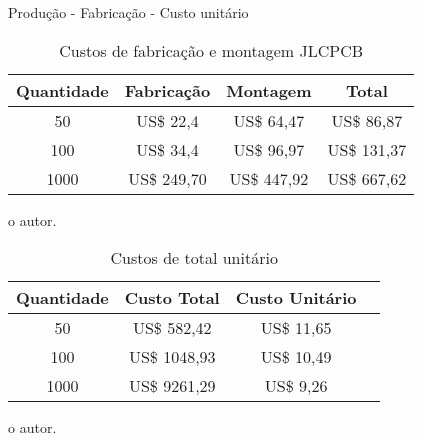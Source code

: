 \begin{frame}{Produção - Fabricação - Custo unitário}


	\begin{table}[!h]
	\captionsetup{width=9cm}%
	\caption{\label{tab:custos_montagem} Custos de fabricação e montagem JLCPCB}%
% 	
		\begin{tabular}{cccc}
			\toprule
			Quantidade & Fabricação & Montagem & Total \\
			\midrule \midrule
			50 &  US\$ 22,4 & US\$ 64,47 & US\$ 86,87 \\
			100 &  US\$ 34,4 & US\$ 96,97 & US\$ 131,37 \\
			1000 & US\$ 249,70 & US\$ 447,92 & US\$ 667,62 \\
			\bottomrule
		\end{tabular}%
	{%
	
    }
    
    \tiny{o autor.}%
    \end{table}



    \begin{table}[!h]
	\captionsetup{width=7cm}%
	\caption{\label{tab:custos_fabricacao_unitário} Custos de total unitário}%
% 	
		\begin{tabular}{cccc}
			\toprule
			Quantidade & Custo Total & Custo Unitário  \\
			\midrule \midrule
			50 &  US\$ 582,42 & US\$ 11,65 \\
			100 &  US\$ 1048,93 & US\$ 10,49  \\
			1000 & US\$ 9261,29 & US\$ 9,26  \\
			\bottomrule
		\end{tabular}%
	{%
	
    }
    
    \tiny{o autor.}%
    
    \end{table}




\end{frame}




